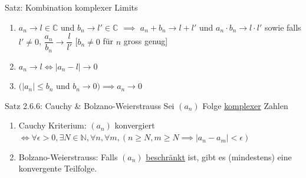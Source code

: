 \documentclass[a4paper,10pt]{article}
\begin{document}
\begin{tbox}
    {Satz: Kombination komplexer Limits}
    \begin{enumerate}
        \item $a_n\longrightarrow l \in \mathbb C$ und $b_n\longrightarrow l'\in \mathbb C$ $\implies$ $a_n+b_n \longrightarrow l+ l'$ und $a_n\cdot b_n \longrightarrow l \cdot l'$ sowie falls $ l'\neq 0$, $\dfrac{a_n}{b_n}\longrightarrow \dfrac{l}{l'}$ [$b_n\neq 0$ für $n$ gross genug]
        \item $a_n \longrightarrow l \iff |a_n-l|\longrightarrow 0$
        \item $(|a_n|\le b_n$ und $b_n\longrightarrow 0) \implies a_n \longrightarrow 0$
    \end{enumerate}
\end{tbox}

\begin{tbox}
    {Satz 2.6.6: Cauchy \& Bolzano-Weierstrauss}
    Sei $(a_n)$ Folge \underline{komplexer} Zahlen
    \begin{enumerate}
        \item Cauchy Kriterium: $(a_n) $ konvergiert $\iff \forall \epsilon >0, \exists N\in \mathbb N, \forall n, \forall m, (n\ge N, m\ge N \implies |a_n-a_m|<\epsilon)$
        \item Bolzano-Weierstrauss: Falls $(a_n)$  \underline{beschränkt} ist, gibt es (mindestens) eine konvergente Teilfolge.
    \end{enumerate}
\end{tbox}
\end{document}
